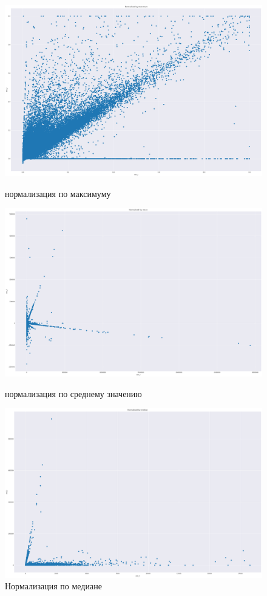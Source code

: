 \documentclass{article}
\begin{document}
\begin{figure}[!h]
%
\includegraphics[width=\linewidth]{imgs/dist_max.png}
  \caption{нормализация по максимуму}\label{fig:dist_max}
\endminipage
{}%
\includegraphics[width=\linewidth]{imgs/dist_mean.png}
  \caption{нормализация по среднему значению}\label{fig:dist_mean}
\endminipage
{}
\includegraphics[width=\linewidth]{imgs/dist_med.png}
  \caption{Нормализация по медиане}\label{fig:dist_med}
\endminipage\hfill
\end{figure}
\end{document}
